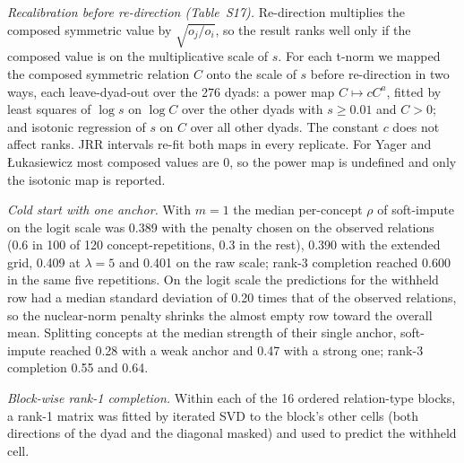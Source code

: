 \documentclass[journal]{IEEEtran}
\begin{document}
\emph{Recalibration before re-direction (Table~S17).} Re-direction multiplies the composed symmetric value by $\sqrt{o_j/o_i}$, so the result ranks well only if the composed value is on the multiplicative scale of $s$. For each t-norm we mapped the composed symmetric relation $C$ onto the scale of $s$ before re-direction in two ways, each leave-dyad-out over the 276 dyads: a power map $C\mapsto cC^a$, fitted by least squares of $\log s$ on $\log C$ over the other dyads with $s\ge0.01$ and $C>0$; and isotonic regression of $s$ on $C$ over all other dyads. The constant $c$ does not affect ranks. JRR intervals re-fit both maps in every replicate. For Yager and {\L}ukasiewicz most composed values are 0, so the power map is undefined and only the isotonic map is reported.

\emph{Cold start with one anchor.} With $m=1$ the median per-concept $\rho$ of soft-impute on the logit scale was 0.389 with the penalty chosen on the observed relations (0.6 in 100 of 120 concept-repetitions, 0.3 in the rest), 0.390 with the extended grid, 0.409 at $\lambda=5$ and 0.401 on the raw scale; rank-3 completion reached 0.600 in the same five repetitions. On the logit scale the predictions for the withheld row had a median standard deviation of 0.20 times that of the observed relations, so the nuclear-norm penalty shrinks the almost empty row toward the overall mean. Splitting concepts at the median strength of their single anchor, soft-impute reached 0.28 with a weak anchor and 0.47 with a strong one; rank-3 completion 0.55 and 0.64.

\emph{Block-wise rank-1 completion.} Within each of the 16 ordered relation-type blocks, a rank-1 matrix was fitted by iterated SVD to the block's other cells (both directions of the dyad and the diagonal masked) and used to predict the withheld cell.
\end{document}
